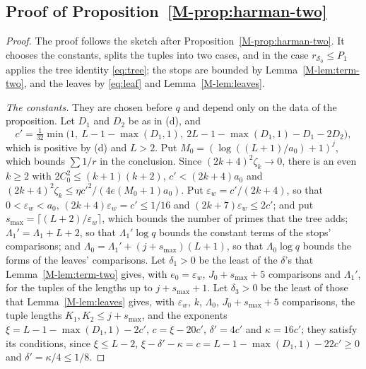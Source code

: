 \documentclass[11pt]{article}
\numberwithin{equation}{section}
\begin{document}
\subsection*{Proof of Proposition~\ref{M-prop:harman-two}}

\begin{proof}
The proof follows the sketch after Proposition~\ref{M-prop:harman-two}. It chooses the constants, splits the tuples
into two cases, and in the case $r_{\mathcal S_0} \le P_1$ applies the tree identity \eqref{eq:tree}; the stops are
bounded by Lemma~\ref{M-lem:term-two}, and the leaves by \eqref{eq:leaf} and Lemma~\ref{M-lem:leaves}.

\emph{The constants.} They are chosen before $q$ and depend only on the data of the proposition. Let $D_1$ and $D_2$ be
as in (d), and
\[
  c' = \tfrac1{32} \min\bigl(1,\ L - 1 - \max(D_1, 1),\ 2L - 1 - \max(D_1, 1) - D_1 - 2D_2\bigr),
\]
which is positive by (d) and $L > 2$. Put $M_0 = (\log((L + 1)/a_0) + 1)^j$, which bounds $\sum 1/r$ in the
conclusion. Since $(2k + 4)^2 \zeta_k \to 0$, there is
an even $k \ge 2$ with $2C_0^2 \le (k + 1)(k + 2)$, $c' < (2k + 4)a_0$ and $(2k + 4)^2 \zeta_k \le \eta c'^2/(4e(M_0 +
1)a_0)$. Put $\varepsilon_w = c'/(2k + 4)$, so that $0 < \varepsilon_w < a_0$, $(2k + 4)\varepsilon_w = c' \le 1/16$ and
$(2k + 7)\varepsilon_w \le 2c'$; and put $s_{\max} = \lceil (L + 2)/\varepsilon_w \rceil$, which bounds the number of
primes that the tree adds; $\Lambda_1' = \Lambda_1 + L + 2$, so that $\Lambda_1' \log q$ bounds the constant terms of
the stops' comparisons; and $\Lambda_0 = \Lambda_1' + (j + s_{\max})(L + 1)$, so that $\Lambda_0 \log q$ bounds the
forms of the leaves' comparisons. Let $\delta_1 >
0$ be the least of the $\delta$'s that
Lemma~\ref{M-lem:term-two} gives, with $e_0 = \varepsilon_w$, $J_0 + s_{\max} + 5$ comparisons and $\Lambda_1'$, for the
tuples of the lengths up to $j + s_{\max} + 1$. Let $\delta_3 > 0$ be the least of those that Lemma~\ref{M-lem:leaves}
gives, with $\varepsilon_w$, $k$, $\Lambda_0$, $J_0 + s_{\max} + 5$ comparisons, the tuple lengths $K_1, K_2 \le j +
s_{\max}$, and the exponents $\xi = L - 1 - \max(D_1, 1) - 2c'$, $c = \xi - 20c'$, $\delta' = 4c'$ and $\kappa = 16c'$;
they
satisfy its conditions, since $\xi \le L - 2$, $\xi - \delta' - \kappa = c = L - 1 - \max(D_1, 1) - 22c' \ge 0$ and
$\delta'
= \kappa/4 \le 1/8$.


\end{proof}
\end{document}
